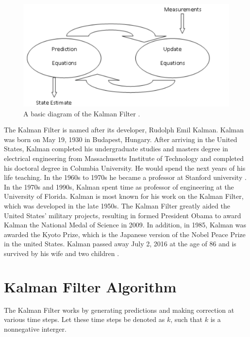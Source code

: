 \newpage

\begin{figure}[h]
    \centering
    \includegraphics[scale = 0.3]{diagram.png}
    \caption{A basic diagram of the Kalman Filter \cite{kohanbash_2014}.}
    \label{coffee}
\end{figure}

\newpage

\noindent The Kalman Filter is named after its developer, Rudolph Emil Kalman. Kalman was born on May 19, 1930 in Budapest, Hungary. After arriving in the United States, Kalman completed his undergraduate studies and masters degree in electrical engineering from Massachusetts Institute of Technology  and completed his doctoral degree in Columbia University. He would spend the next years of his life teaching. In the 1960s to 1970s he became a professor at Stanford university \cite{kalmanbio}. In the 1970s and 1990s, Kalman spent time as professor of  engineering at the University of Florida. Kalman is most known for his work on the Kalman Filter, which was developed in the late 1950s. The Kalman Filter greatly aided the United States' military projects, resulting in formed President Obama to award Kalman the National Medal of Science in 2009. In addition, in 1985, Kalman was awarded the Kyoto Prize, which is the Japanese version of the Nobel Peace Prize in the united States. Kalman passed away July 2, 2016 at the age of 86 and is survived by his wife and two children \cite{Kalman_bio}. 


\newpage

\section{Kalman Filter Algorithm}

The Kalman Filter works by generating predictions and making correction at various time steps. Let these time steps be denoted as $k$, such that $ k $ is a nonnegative interger. 

